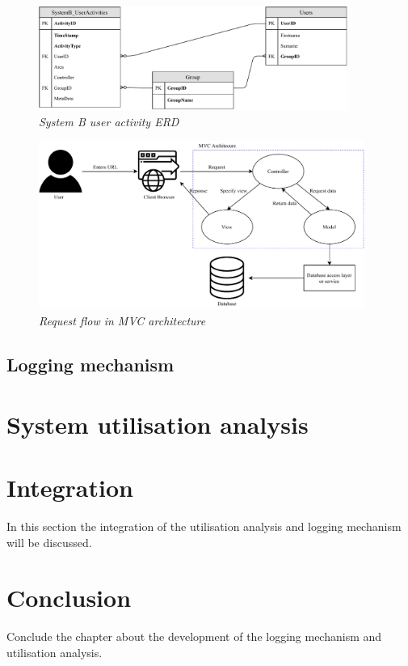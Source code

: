 \clearpage

\begin{figure}[!htb] %
	\centering %
	\includegraphics[width=0.9\textwidth]{Images/Chapter2/SystemB_ERD_Basic/SystemB_ERD_Basic.pdf}
	\caption[System B user activity ERD]
	{\textit{System B user activity ERD}}\label{fig:SystemB_Basic_ERD}
\end{figure}

\begin{figure}[!htb] %
	\centering %
	\includegraphics[width=0.95\textwidth]{Images/Chapter2/Flow_MVC_Architecture/Flow_MVC_Architecture.pdf}
	\caption[Request flow in MVC architecture]
	{\textit{Request flow in MVC architecture \cite{Gu2010}}}\label{fig:Flow_MVC_Architecture}
\end{figure}

\subsection{Logging mechanism}

\section{System utilisation analysis}

\section{Integration}
In this section the integration of the utilisation analysis and logging mechanism will be discussed.

\section{Conclusion}
Conclude the chapter about the development of the logging mechanism and utilisation analysis.